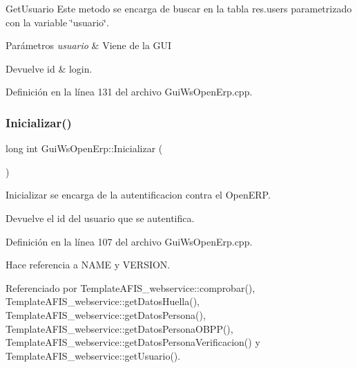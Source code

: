 Get\+Usuario Este metodo se encarga de buscar en la tabla res.\+users parametrizado con la variable \char`\"{}usuario\char`\"{}. 


\begin{DoxyParams}{Parámetros}
{\em usuario} & Viene de la G\+UI \\
\hline
\end{DoxyParams}
\begin{DoxyReturn}{Devuelve}
id \& login. 
\end{DoxyReturn}


Definición en la línea 131 del archivo Gui\+Ws\+Open\+Erp.\+cpp.

\hypertarget{classGuiWsOpenErp_a48d629317e4b3be8b5471e5a14a60082}{}\label{classGuiWsOpenErp_a48d629317e4b3be8b5471e5a14a60082} 
\subsubsection{\texorpdfstring{Inicializar()}{Inicializar()}}
{\footnotesize\ttfamily long int Gui\+Ws\+Open\+Erp\+::\+Inicializar (\begin{DoxyParamCaption}{ }\end{DoxyParamCaption})\hspace{0.3cm}{\ttfamily [inline]}}



Inicializar se encarga de la autentificacion contra el Open\+E\+RP. 

\begin{DoxyReturn}{Devuelve}
el id del usuario que se autentifica. 
\end{DoxyReturn}


Definición en la línea 107 del archivo Gui\+Ws\+Open\+Erp.\+cpp.



Hace referencia a N\+A\+ME y V\+E\+R\+S\+I\+ON.



Referenciado por Template\+A\+F\+I\+S\+\_\+webservice\+::comprobar(), Template\+A\+F\+I\+S\+\_\+webservice\+::get\+Datos\+Huella(), Template\+A\+F\+I\+S\+\_\+webservice\+::get\+Datos\+Persona(), Template\+A\+F\+I\+S\+\_\+webservice\+::get\+Datos\+Persona\+O\+B\+P\+P(), Template\+A\+F\+I\+S\+\_\+webservice\+::get\+Datos\+Persona\+Verificacion() y Template\+A\+F\+I\+S\+\_\+webservice\+::get\+Usuario().




